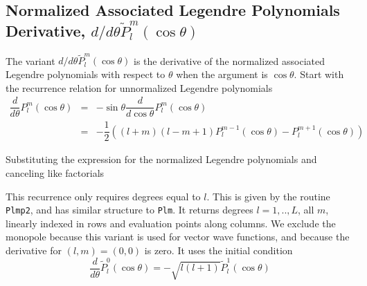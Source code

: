 {\footnotesize
{}
}


\subsection{Normalized Associated Legendre Polynomials Derivative, $d/d\theta\widetilde{P}_l^m(\cos\theta)$}


The variant $d/d\theta\widetilde{P}_l^m(\cos\theta)$ is the derivative of the normalized associated Legendre polynomials with respect to $\theta$ when the argument is $\cos\theta$.  Start with the recurrence relation for unnormalized Legendre polynomials 
\begin{eqnarray}
\dfrac{d}{d\theta}P_l^m(\cos\theta) &= &-\sin\theta \dfrac{d}{d\cos\theta}P_l^m(\cos\theta)  \\
\ &=& -\dfrac{1}{2}\left((l+m)(l-m+1)P_l^{m-1}(\cos\theta) -P_l^{m+1}(\cos\theta)\right) 
\end{eqnarray}

Substituting the expression for the normalized Legendre polynomials and canceling like factorials 
%

This recurrence only requires degrees equal to $l$.  This is given by the routine \texttt{Plmp2}, and has similar structure to \texttt{Plm}.  It returns degrees $l = 1,..,L$, all $m$, linearly indexed in rows and evaluation points along columns.  We exclude the monopole because this variant is used for vector wave functions, and because the derivative for $(l,m) = (0,0)$ is zero.  It uses the initial condition 
\begin{equation}
\dfrac{d}{d\theta}\widetilde{P}_l^0(\cos\theta) = -\sqrt{l(l+1)}\widetilde{P}_l^1(\cos\theta) 
\end{equation}

{\footnotesize
{}
}
